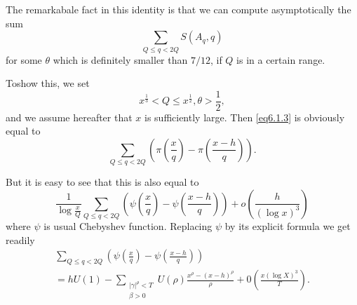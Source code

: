  The remarkabale fact in this identity is that we can compute
 asymptotically the sum 
  \begin{equation*}
\sum_{Q \leq q < 2Q} S(A_q, q) \tag{6.1.3}\label{eq6.1.3}
 \end{equation*} 
for some $\theta$ which is definitely smaller than $7/12$, if $Q$ is
in a certain range. 
  
To\pageoriginale show this, we set
 \begin{equation*}
   x^{\frac{1}{3}} < Q \leq x^{\frac{1}{2}}, \theta > \frac{1}{2},
   \tag{6.1.4}\label{eq6.1.4} 
 \end{equation*}
 and we assume hereafter that $x$ is sufficiently large. Then
 \eqref{eq6.1.3} is obviously equal to  
$$
\sum_{Q \leq q < 2Q } \left(\pi \left( \frac{x}{q}\right) - \pi \left(
\frac{ x-h}{q}\right)\right). 
$$

But it is easy to see that this is also equal to 
\begin{equation*}
  \frac{1}{\log \frac{x}{Q}} \sum_{ Q \leq q < 2Q } \left( \psi
  \left(\frac{x}{q}\right) - \psi \left(\frac{ x-h}{q}\right)\right) +
  o\left(\frac{h}{(\log x)^3}\right) \tag{6.1.5}\label{eq6.1.5} 
\end{equation*}  
where $\psi $ is usual Chebyshev function. Replacing $\psi$ by its
explicit formula we get readily 
\begin{multline*}
  \sum_{ Q \leq q < 2Q} \left(\psi \left(\frac{x}{q}\right) - \psi
  \left(\frac{x-h}{q}\right)\right)\\ 
  = h U (1) - \sum _{\substack {| \gamma |^\rho < T\\ \beta >0}}
  U (\rho )\frac{x^\rho -(x-h)^\rho}{\rho} + 0 \left( \frac{x (\log
    X)^3}{T}\right). 
\end{multline*}


